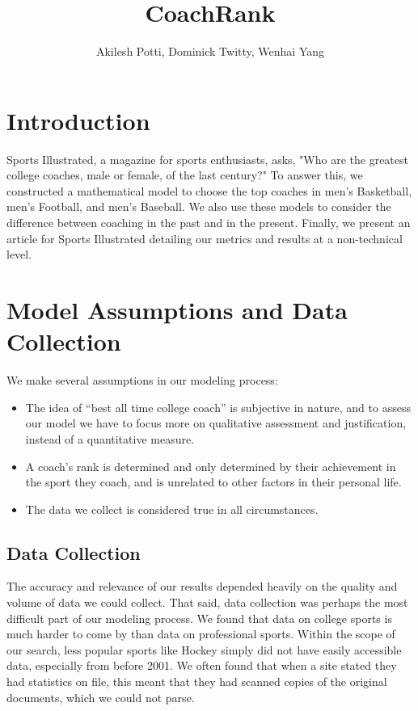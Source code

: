 \documentclass[titlepage,11pt]{article}
\begin{document}
\title{CoachRank}
\author{Akilesh Potti, Dominick Twitty, Wenhai Yang}
\maketitle


\tableofcontents

\section{Introduction}
Sports Illustrated, a magazine for sports enthusiasts, asks, "Who are the greatest college coaches, male or female, of the last century?" To answer this, we constructed a mathematical model to choose the top coaches in men's Basketball, men's Football, and men's Baseball. We also use these models to consider the difference between coaching in the past and in the present. Finally, we present an article for Sports Illustrated detailing our metrics and results at a non-technical level.

\section{Model Assumptions and Data Collection}
We make several assumptions in our modeling process:
\begin{itemize}
\item The idea of ``best all time college coach'' is subjective in nature, and to assess our model we have to focus more on qualitative assessment and justification, instead of a quantitative measure.

\item A coach's rank is determined and only determined by their achievement in the sport they coach, and is unrelated to other factors in their personal life.

\item The data we collect is considered true in all circumstances.
\end{itemize}

\subsection{Data Collection}
The accuracy and relevance of our results depended heavily on the quality and volume of data we could collect. That said, data collection was perhaps the most difficult part of our modeling process. We found that data on college sports is much harder to come by than data on professional sports. Within the scope of our search, less popular sports like Hockey simply did not have easily accessible data, especially from before 2001. We often found that when a site stated they had statistics on file, this meant that they had scanned copies of the original documents, which we could not parse.
\\
\end{document}
